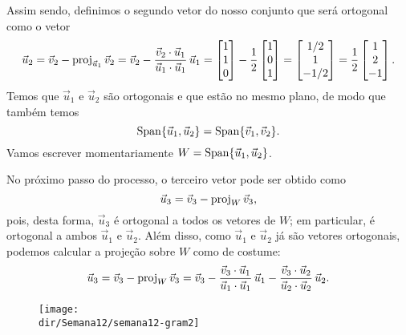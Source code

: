 \documentclass[../livro.tex]{subfiles}  %
\providecommand{\dir}{..}
\begin{document}
\begin{example}
\noindent Assim sendo, definimos o segundo vetor do nosso conjunto que será ortogonal como o vetor
\begin{equation}
\vec{u}_2 = \vec{v}_2 - \operatorname{proj}_{\vec{u}_1} \vec{v}_2 = \vec{v}_2 - \frac{\vec{v}_2 \cdot \vec{u}_1}{\vec{u}_1 \cdot \vec{u}_1} \, \vec{u}_1 =
\begin{bmatrix}
1 \\ 1 \\ 0
\end{bmatrix}
- \frac{1}{2}
\begin{bmatrix}
1 \\ 0 \\ 1
\end{bmatrix} =
\begin{bmatrix}
1/2 \\ 1 \\ -1/2
\end{bmatrix} = \frac{1}{2}
\begin{bmatrix}
1 \\ 2 \\ -1
\end{bmatrix}.
\end{equation} Temos que $\vec{u}_1$ e $\vec{u}_2$ são ortogonais e que estão no mesmo plano, de modo que também temos
\begin{equation}
\operatorname{Span} \{ \vec{u}_1, \vec{u}_2 \} = \operatorname{Span} \{ \vec{v}_1, \vec{v}_2 \}.
\end{equation} Vamos escrever momentariamente $W = \operatorname{Span} \{ \vec{u}_1, \vec{u}_2 \}$.

No próximo passo do processo, o terceiro vetor pode ser obtido como
\begin{equation}
\vec{u}_3 = \vec{v}_3 - \operatorname{proj}_{W} \vec{v}_3,
\end{equation} pois, desta forma, $\vec{u}_3$ é ortogonal a todos os vetores de $W$; em particular, é ortogonal a ambos $\vec{u}_1$ e $\vec{u}_2$. Além disso, como $\vec{u}_1$ e $\vec{u}_2$ já são vetores ortogonais, podemos calcular a projeção sobre $W$ como de costume:
\begin{equation}
\vec{u}_3 = \vec{v}_3 - \operatorname{proj}_{W} \vec{v}_3 = \vec{v}_3 - \frac{\vec{v}_3 \cdot \vec{u}_1}{\vec{u}_1 \cdot \vec{u}_1} \, \vec{u}_1 - \frac{\vec{v}_3 \cdot \vec{u}_2}{\vec{u}_2 \cdot \vec{u}_2} \, \vec{u}_2.
\end{equation}
\begin{figure}[h!]
\begin{center}
\texttt{[image: \\dir/Semana12/semana12-gram2]}
\end{center}
\end{figure}


\end{example}
\end{document}
